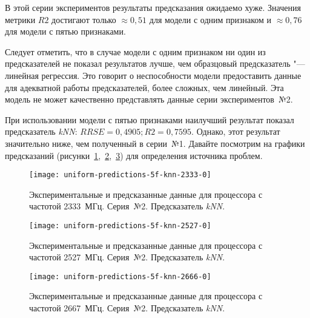 В этой серии экспериментов результаты предсказания ожидаемо хуже. Значения метрики $R2$ достигают только $\approx 0,51$ для модели с одним признаком и $\approx 0,76$ для модели с пятью признаками.

Следует отметить, что в случае модели с одним признаком ни один из предсказателей не показал результатов лучше, чем образцовый предсказатель "--- линейная регрессия. Это говорит о неспособности модели предоставить данные для адекватной работы предсказателей, более сложных, чем линейный. Эта модель не может качественно представлять данные серии экспериментов~№2.

При использовании модели с пятью признаками наилучший результат показал предсказатель \textit{kNN}: $RRSE = 0,4905; R2 = 0,7595$. Однако, этот результат значительно ниже, чем полученный в серии~№1. Давайте посмотрим на графики предсказаний (рисунки~\ref{img:uniform-predictions-5f-knn-2333-0},~\ref{img:uniform-predictions-5f-knn-2527-0},~\ref{img:uniform-predictions-5f-knn-2666-0}) для определения источника проблем.

\begin{figure}[H]
    \begin{center}
        \texttt{[image: uniform-predictions-5f-knn-2333-0]}
        \caption{Экспериментальные и предсказанные данные для процессора с частотой 2333~МГц. Серия~№2. Предсказатель \textit{kNN}.}
        \label{img:uniform-predictions-5f-knn-2333-0}
    \end{center}
\end{figure}

\begin{figure}[H]
    \begin{center}
        \texttt{[image: uniform-predictions-5f-knn-2527-0]}
        \caption{Экспериментальные и предсказанные данные для процессора с частотой 2527~МГц. Серия~№2. Предсказатель \textit{kNN}.}
        \label{img:uniform-predictions-5f-knn-2527-0}
    \end{center}
\end{figure}

\begin{figure}[H]
    \begin{center}
        \texttt{[image: uniform-predictions-5f-knn-2666-0]}
        \caption{Экспериментальные и предсказанные данные для процессора с частотой 2667~МГц. Серия~№2. Предсказатель \textit{kNN}.}
        \label{img:uniform-predictions-5f-knn-2666-0}
    \end{center}
\end{figure}

